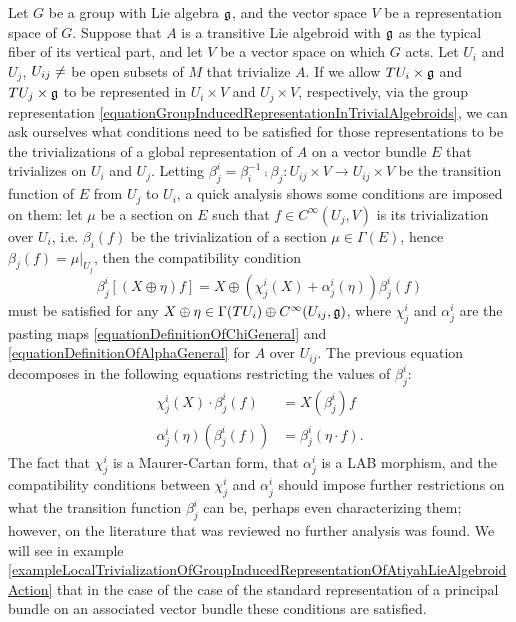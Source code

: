 Let $G$ be a group with Lie algebra $\mathfrak{g}$, and the vector space $V$ be a representation space of $G$. Suppose that $A$ is a transitive Lie algebroid with $\mathfrak{g}$ as the typical fiber of its vertical part, and let $V$ be a vector space on which $G$ acts. Let $U_i$ and $U_j$, $U_{ij} \neq \empty$ be open subsets of $M$ that trivialize $A$. If we allow $TU_i \times \mathfrak{g}$ and $TU_j \times \mathfrak{g}$ to be represented in $U_i \times V$ and $U_j \times V$, respectively, via the group representation \eqref{equationGroupInducedRepresentationInTrivialAlgebroids}, we can ask ourselves what conditions need to be satisfied for those representations to be the trivializations of a global representation of $A$ on a vector bundle $E$ that trivializes on $U_i$ and $U_j$. Letting $\beta^i_j = \beta_i^{-1} \comp \beta_j : U_{ij} \times V \to U_{ij} \times V$ be the transition function of $E$ from $U_j$ to $U_i$, a quick analysis shows some conditions are imposed on them: let $\mu$ be a section on $E$ such that $f \in C^\infty(U_{j}, V)$ is its trivialization over $U_i$, i.e. $\beta_i(f) $ be the trivialization of a section $\mu \in \Gamma(E)$, hence $\beta_j(f) = \mu|_{U_j}$, then the compatibility condition 
\begin{equation}
    \beta_j^i[(X \oplus \eta) f] = X \oplus (\chi^i_j(X) + \alpha^i_j(\eta))\beta^i_j(f)
\end{equation}
must be satisfied for any $X \oplus \eta \in \Gamma(TU_i) \oplus C^\infty(U_{ij}, \mathfrak{g})$, where $\chi^i_j$ and $\alpha^i_j$ are the pasting maps \eqref{equationDefinitionOfChiGeneral} and \eqref{equationDefinitionOfAlphaGeneral} for $A$ over $U_{ij}$. The previous equation decomposes in the following equations restricting the values of $\beta^i_j$:
\begin{align}
    \chi^i_j(X) \cdot \beta^i_j(f) &= X(\beta^i_j)f\\
    \alpha^i_j(\eta)(\beta^i_j(f)) &= \beta^i_j(\eta \cdot f).
\end{align}
The fact that $\chi^i_j$ is a Maurer-Cartan form, that $\alpha^i_j$ is a LAB morphism, and the compatibility conditions between $\chi^i_j$ and $\alpha^i_j$ should impose further restrictions on what the transition function $\beta^i_j$ can be, perhaps even characterizing them; however, on the literature that was reviewed no further analysis was found. We will see in example \ref{exampleLocalTrivializationOfGroupInducedRepresentationOfAtiyahLieAlgebroidAction} that in the case of the case of the standard representation of a principal bundle on an associated vector bundle these conditions are satisfied.


